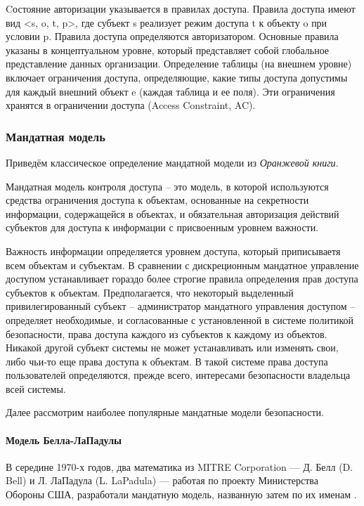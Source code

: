 Cостояние авторизации указывается в правилах доступа. Правила доступа имеют вид <s, o, t, p>, где субъект s
реализует режим доступа t к объекту o при условии p. Правила доступа определяются авторизатором. Основные правила
указаны в концептуальном уровне, который представляет собой глобальное представление данных организации. Определение
таблицы (на внешнем уровне) включает ограничения доступа, определяющие, какие типы доступа допустимы для
каждый внешний объект e (каждая таблица и ее поля). Эти ограничения хранятся в ограничении доступа (Access Constraint, AC).

\subsubsection{Мандатная модель}

Приведём классическое определение мандатной модели из \textit{Оранжевой книги}.

\begin{grayquote}
Мандатная модель контроля доступа – это модель, в которой используются средства ограничения доступа к объектам,  основанные на секретности информации,  содержащейся в объектах, и обязательная авторизация действий субъектов для доступа к информации с присвоенным уровнем важности.
\end{grayquote}

Важность информации определяется уровнем доступа,  который приписываетя всем объектам и субъектам.  В сравнении с дискреционным мандатное управление доступом устанавливает гораздо более строгие правила определения прав доступа субъектов к объектам. Предполагается, что некоторый выделенный привилегированный субъект – администратор мандатного управления доступом – определяет необходимые, и согласованные с установленной в системе политикой безопасности, права доступа каждого из субъектов к каждому из объектов. Никакой другой субъект системы не может устанавливать или изменять свои, либо чьи-то еще права доступа к объектам. В такой системе права доступа пользователей определяются, прежде всего, интересами безопасности владельца всей системы.

Далее рассмотрим наиболее популярные мандатные модели безопасности.

\paragraph{Модель Белла-ЛаПадулы}

В середине 1970-х годов, два математика из MITRE Corporation --- Д. Белл (D. Bell) и Л. ЛаПадула (L. LaPadula) --- работая по проекту Министерства Обороны США, разработали мандатную модель, названную затем по их именам \cite{BellLaPadulaModel}.

